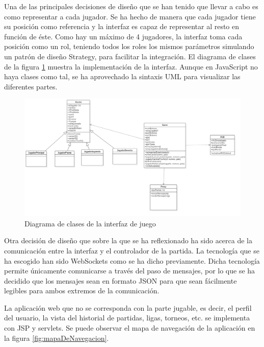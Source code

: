 Una de las principales decisiones de diseño que se han tenido que llevar a cabo es como representar a cada jugador. Se ha hecho de manera que cada jugador tiene su posición como referencia y la interfaz es capaz de representar al resto en función de éste. Como hay un máximo de 4 jugadores, la interfaz toma cada posición como un rol,  teniendo todos los roles los mismos parámetros simulando un patrón de diseño Strategy, para facilitar la integración. El diagrama de clases de la figura \ref{fig:clasesInterfazJuego} muestra la implementación de la interfaz. Aunque en JavaScript no haya clases como tal, se ha aprovechado la sintaxis UML para visualizar las diferentes partes.

\begin{figure}
  \includegraphics[width=\linewidth]{figuras/clasesInterfazJuego.png}
  \caption{Diagrama de clases de la interfaz de juego}
  \label{fig:clasesInterfazJuego}
\end{figure}

Otra decisión de diseño que sobre la que se ha reflexionado ha sido acerca de la comunicación entre la interfaz y el controlador de la partida. La tecnología que se ha escogido han sido WebSockets como se ha dicho previamente. Dicha tecnología permite únicamente comunicarse a través del paso de mensajes, por lo que se ha decidido que los mensajes sean en formato JSON para que sean fácilmente legibles para ambos extremos de la comunicación.

La aplicación web que no se corresponda con la parte jugable, es decir, el perfil del usuario, la vista del historial de partidas, ligas, torneos, etc. se implementa con JSP y servlets. Se puede observar el mapa de navegación de la aplicación en la figura \ref{fig:mapaDeNavegacion}.

